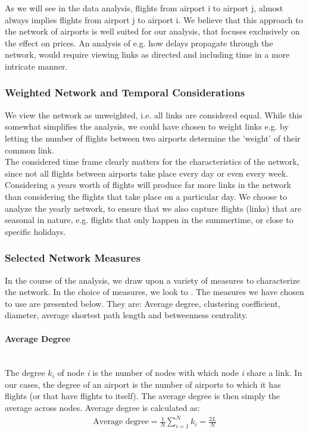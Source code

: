 As we will see in the data analysis, flights from airport i to airport j, almost always implies flights from airport j to airport i. We believe that this approach to the network of airports is well suited for our analysis, that focuses exclusively on the effect on prices. An analysis of e.g. how delays propagate through the network, would require viewing links as directed and including time in a more intricate manner.

\subsubsection{Weighted Network and Temporal Considerations}
We view the network as unweighted, i.e. all links are considered equal. While this somewhat simplifies the analysis, we could have chosen to weight links e.g. by letting the number of flights between two airports determine the 'weight' of their common link. \\
The considered time frame clearly matters for the characteristics of the network, since not all flights between airports take place every day or even every week. Considering a years worth of flights will produce far more links in the network than considering the flights that take place on a particular day. We choose to analyze the yearly network, to ensure that we also capture flights (links) that are seasonal in nature, e.g. flights that only happen in the summertime, or close to specific holidays. 

\subsubsection{Selected Network Measures}
In the course of the analysis, we draw upon a variety of measures to characterize the network. In the choice of measures, we look to \citet{chi2004structural}. The measures we have chosen to use are presented below. They are: Average degree, clustering coefficient, diameter, average shortest path length and betweenness centrality.

\paragraph{Average Degree}\mbox{} \\
The degree $k_i$ of node \textit{i} is the number of nodes with which node \textit{i} share a link. In our cases, the degree of an airport is the number of airports to which it has flights (or that have flights to itself). 
The average degree is then simply the average across nodes. Average degree is calculated as: 
\begin{align}
    \text{Average degree} = \frac{1}{N} \sum_{i = 1}^N k_i = \frac{2L}{N}
\end{align}

